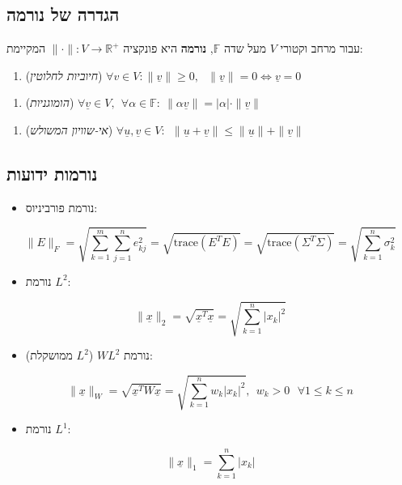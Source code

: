 \documentclass[11pt]{article}
\begin{document}
\subsection{הגדרה של נורמה}
\label{sec:orge5a38a6}
עבור מרחב וקטורי \(V\) מעל שדה \(\mathbb{F}\), \textbf{נורמה} היא פונקציה \(\|\mathord{\cdot}\| : V \to \mathbb{R}^{+}\) המקיימת:
\begin{enumerate}
\item (\emph{חיוביות לחלוטין}) \(\forall v \in V : \|\underline{v}\| \ge 0,\ \ \ \|\underline{v}\| = 0 \iff \underline{v} = 0\)
\end{enumerate}


\begin{enumerate}
\item (\emph{הומוגניות}) \(\forall \underline{v} \in V,\ \ \forall \alpha \in \mathbb{F}:\ \|\alpha \underline{v}\| = \left| \alpha \right| \cdot \|\underline{v}\|\)
\end{enumerate}


\begin{enumerate}
\item (\emph{אי-שוויון המשולש}) \(\forall \underline{u},\underline{v} \in V:\ \ \|\underline{u} + \underline{v}\| \le \|\underline{u}\| + \|\underline{v}\|\)
\end{enumerate}

\subsection{נורמות ידועות}
\label{sec:org522fd17}
\begin{itemize}
\item נורמת פורביניוס:
\end{itemize}
\[
\|E\|_F = \sqrt{\sum_{k=1}^m \sum_{j=1}^{n}e_{kj}^2} = \sqrt{\text{trace} \left( E^TE \right)}
=
\sqrt{\text{trace} \left( \Sigma^T\Sigma \right)}
=
\sqrt{\sum_{k=1}^n \sigma_k^2}
\]

\begin{itemize}
\item נורמת \(L^2\):
\end{itemize}
\[
\|\underline{x}\|_2 = \sqrt{\underline{x}^T\underline{x}} = \sqrt{\sum_{k=1}^n \left| x_k \right|^2}
\]

\begin{itemize}
\item נורמת \(WL^2\) (\(L^{2}\) ממושקלת):
\end{itemize}
\[
\|\underline{x}\|_W = \sqrt{\underline{x}^TW\underline{x}} = \sqrt{\sum_{k=1}^n w_k \left| x_k \right|^2}, \ \ w_k > 0\ \ \  \forall 1 \le k \le n
\]
\begin{itemize}
\item נורמת \(L^1\):
\end{itemize}
\[
  \|\underline{x}\|_1 = \sum_{k=1}^{n} \left| x_k \right|
\]
\end{document}
